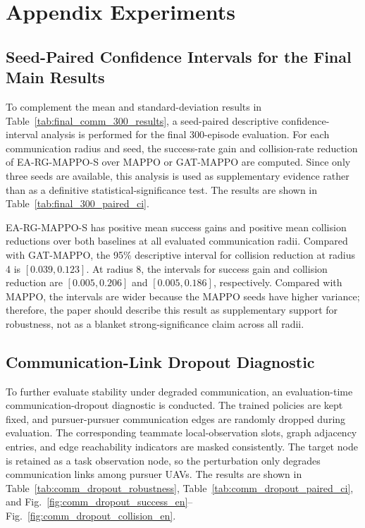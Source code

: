 \appendix
\section{Appendix Experiments}

\subsection{Seed-Paired Confidence Intervals for the Final Main Results}

To complement the mean and standard-deviation results in Table~\ref{tab:final_comm_300_results}, a seed-paired descriptive confidence-interval analysis is performed for the final 300-episode evaluation. For each communication radius and seed, the success-rate gain and collision-rate reduction of EA-RG-MAPPO-S over MAPPO or GAT-MAPPO are computed. Since only three seeds are available, this analysis is used as supplementary evidence rather than as a definitive statistical-significance test. The results are shown in Table~\ref{tab:final_300_paired_ci}.



EA-RG-MAPPO-S has positive mean success gains and positive mean collision reductions over both baselines at all evaluated communication radii. Compared with GAT-MAPPO, the 95\% descriptive interval for collision reduction at radius 4 is $[0.039,0.123]$. At radius 8, the intervals for success gain and collision reduction are $[0.005,0.206]$ and $[0.005,0.186]$, respectively. Compared with MAPPO, the intervals are wider because the MAPPO seeds have higher variance; therefore, the paper should describe this result as supplementary support for robustness, not as a blanket strong-significance claim across all radii.

\subsection{Communication-Link Dropout Diagnostic}

To further evaluate stability under degraded communication, an evaluation-time communication-dropout diagnostic is conducted. The trained policies are kept fixed, and pursuer-pursuer communication edges are randomly dropped during evaluation. The corresponding teammate local-observation slots, graph adjacency entries, and edge reachability indicators are masked consistently. The target node is retained as a task observation node, so the perturbation only degrades communication links among pursuer UAVs. The results are shown in Table~\ref{tab:comm_dropout_robustness}, Table~\ref{tab:comm_dropout_paired_ci}, and Fig.~\ref{fig:comm_dropout_success_en}--Fig.~\ref{fig:comm_dropout_collision_en}.

